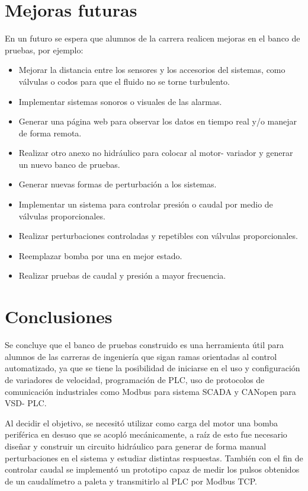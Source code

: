 
\clearpage
\newpage

\section{Mejoras futuras}
En un futuro se espera que alumnos de la carrera realicen mejoras en el banco de pruebas, por ejemplo:
\begin{itemize}
	\item Mejorar la distancia entre los sensores y los accesorios del sistemas, como válvulas o codos para que el fluido no se torne turbulento.
	\item Implementar sistemas sonoros o visuales de las alarmas.
	\item Generar una página web para observar los datos en tiempo real y/o manejar de forma remota.
	\item Realizar otro anexo no hidráulico para colocar al motor- variador y generar un nuevo banco de pruebas.
	\item Generar nuevas formas de perturbación a los sistemas.
	\item Implementar un sistema para controlar presión o caudal por medio de válvulas proporcionales.
	\item Realizar perturbaciones controladas y repetibles con válvulas proporcionales.
	\item Reemplazar bomba por una en mejor estado.
	\item Realizar pruebas de caudal y presión a mayor frecuencia.
\end{itemize}

\newpage
\section{Conclusiones}


Se concluye que el banco de pruebas construido es una herramienta útil para alumnos de las carreras de ingeniería que sigan ramas orientadas al control automatizado, ya que se tiene la posibilidad de iniciarse en el uso y configuración de variadores de velocidad, programación de PLC, uso de protocolos de comunicación industriales como Modbus para sistema SCADA y CANopen para VSD- PLC.

Al decidir el objetivo, se necesitó utilizar como carga del motor una bomba periférica en desuso que se acopló mecánicamente, a raíz de esto fue necesario diseñar y construir un circuito hidráulico para generar de forma manual perturbaciones en el sistema y estudiar distintas respuestas. También con el fin de controlar caudal se implementó un prototipo capaz de medir los pulsos obtenidos de un caudalímetro a paleta y transmitirlo al PLC por Modbus TCP. 

